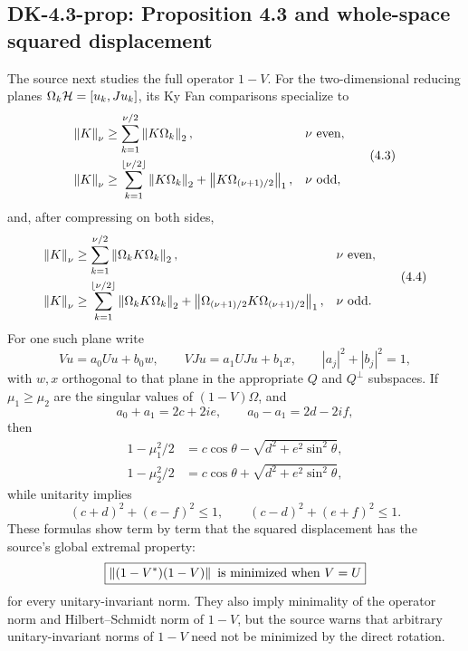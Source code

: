 \subsection*{DK-4.3-prop: Proposition 4.3 and whole-space squared displacement}
The source next studies the full operator $1-V$.  For the two-dimensional reducing planes $\Omega_k\mathcal{H}=[u_k,Ju_k]$, its Ky Fan comparisons specialize to
\begin{equation}
\begin{aligned}
 \left\lVert K\right\rVert_{\nu}&\ge\sum_{k=1}^{\nu/2}\left\lVert K\Omega_k\right\rVert_2,
 &&\nu\text{ even},\\
 \left\lVert K\right\rVert_{\nu}&\ge\sum_{k=1}^{\lfloor\nu/2\rfloor}\left\lVert K\Omega_k\right\rVert_2
 +\left\lVert K\Omega_{(\nu+1)/2}\right\rVert_1,
 &&\nu\text{ odd},
\end{aligned}
\tag{4.3}
\end{equation}
and, after compressing on both sides,
\begin{equation}
\begin{aligned}
 \left\lVert K\right\rVert_{\nu}&\ge\sum_{k=1}^{\nu/2}\left\lVert \Omega_kK\Omega_k\right\rVert_2,
 &&\nu\text{ even},\\
 \left\lVert K\right\rVert_{\nu}&\ge\sum_{k=1}^{\lfloor\nu/2\rfloor}\left\lVert \Omega_kK\Omega_k\right\rVert_2
 +\left\lVert \Omega_{(\nu+1)/2}K\Omega_{(\nu+1)/2}\right\rVert_1,
 &&\nu\text{ odd}.
\end{aligned}
\tag{4.4}
\end{equation}
For one such plane write
\[
 Vu=a_0Uu+b_0w,
 \qquad
 VJu=a_1UJu+b_1x,
 \qquad |a_j|^2+|b_j|^2=1,
\]
with $w,x$ orthogonal to that plane in the appropriate $Q$ and $Q^\perp$ subspaces.  If $\mu_1\ge\mu_2$ are the singular values of $(1-V)\Omega$, and
\[
 a_0+a_1=2c+2ie,
 \qquad
 a_0-a_1=2d-2if,
\]
then
\begin{equation}
\begin{aligned}
 1-\mu_1^2/2&=c\cos\theta-\sqrt{d^2+e^2\sin^2\theta},\\
 1-\mu_2^2/2&=c\cos\theta+\sqrt{d^2+e^2\sin^2\theta},
\end{aligned}
\tag{4.5}
\end{equation}
while unitarity implies
\begin{equation}
 (c+d)^2+(e-f)^2\le1,
 \qquad
 (c-d)^2+(e+f)^2\le1.
 \tag{4.6}
\end{equation}
These formulas show term by term that the squared displacement has the source's global extremal property:
\[
 \boxed{\norm{(1-V^*)(1-V)}\ \text{is minimized when }V=U}
\]
for every unitary-invariant norm.  They also imply minimality of the operator norm and Hilbert--Schmidt norm of $1-V$, but the source warns that arbitrary unitary-invariant norms of $1-V$ need not be minimized by the direct rotation.

